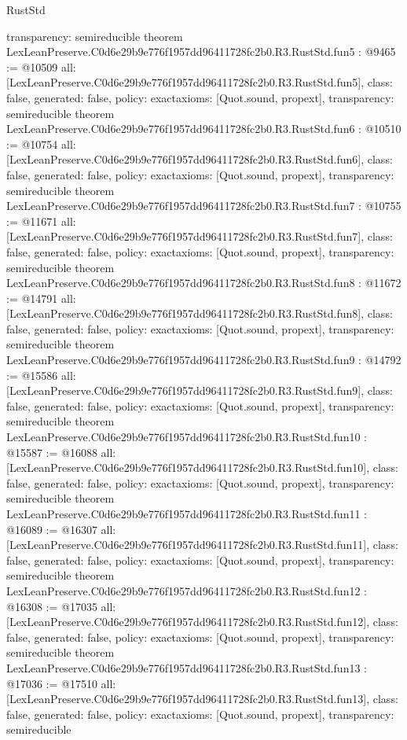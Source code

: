 \begin{lexlean}{RustStd}
\begin{coremodule}
{  transparency: semireducible
}
theorem LexLeanPreserve.C0d6e29b9e776f1957dd96411728fc2b0.R3.RustStd.fun5 : @9465 := @10509 {
  all: [LexLeanPreserve.C0d6e29b9e776f1957dd96411728fc2b0.R3.RustStd.fun5],
  class: false,
  generated: false,
  policy: exact{axioms: [Quot.sound, propext]},
  transparency: semireducible
}
theorem LexLeanPreserve.C0d6e29b9e776f1957dd96411728fc2b0.R3.RustStd.fun6 : @10510 := @10754 {
  all: [LexLeanPreserve.C0d6e29b9e776f1957dd96411728fc2b0.R3.RustStd.fun6],
  class: false,
  generated: false,
  policy: exact{axioms: [Quot.sound, propext]},
  transparency: semireducible
}
theorem LexLeanPreserve.C0d6e29b9e776f1957dd96411728fc2b0.R3.RustStd.fun7 : @10755 := @11671 {
  all: [LexLeanPreserve.C0d6e29b9e776f1957dd96411728fc2b0.R3.RustStd.fun7],
  class: false,
  generated: false,
  policy: exact{axioms: [Quot.sound, propext]},
  transparency: semireducible
}
theorem LexLeanPreserve.C0d6e29b9e776f1957dd96411728fc2b0.R3.RustStd.fun8 : @11672 := @14791 {
  all: [LexLeanPreserve.C0d6e29b9e776f1957dd96411728fc2b0.R3.RustStd.fun8],
  class: false,
  generated: false,
  policy: exact{axioms: [Quot.sound, propext]},
  transparency: semireducible
}
theorem LexLeanPreserve.C0d6e29b9e776f1957dd96411728fc2b0.R3.RustStd.fun9 : @14792 := @15586 {
  all: [LexLeanPreserve.C0d6e29b9e776f1957dd96411728fc2b0.R3.RustStd.fun9],
  class: false,
  generated: false,
  policy: exact{axioms: [Quot.sound, propext]},
  transparency: semireducible
}
theorem LexLeanPreserve.C0d6e29b9e776f1957dd96411728fc2b0.R3.RustStd.fun10 : @15587 := @16088 {
  all: [LexLeanPreserve.C0d6e29b9e776f1957dd96411728fc2b0.R3.RustStd.fun10],
  class: false,
  generated: false,
  policy: exact{axioms: [Quot.sound, propext]},
  transparency: semireducible
}
theorem LexLeanPreserve.C0d6e29b9e776f1957dd96411728fc2b0.R3.RustStd.fun11 : @16089 := @16307 {
  all: [LexLeanPreserve.C0d6e29b9e776f1957dd96411728fc2b0.R3.RustStd.fun11],
  class: false,
  generated: false,
  policy: exact{axioms: [Quot.sound, propext]},
  transparency: semireducible
}
theorem LexLeanPreserve.C0d6e29b9e776f1957dd96411728fc2b0.R3.RustStd.fun12 : @16308 := @17035 {
  all: [LexLeanPreserve.C0d6e29b9e776f1957dd96411728fc2b0.R3.RustStd.fun12],
  class: false,
  generated: false,
  policy: exact{axioms: [Quot.sound, propext]},
  transparency: semireducible
}
theorem LexLeanPreserve.C0d6e29b9e776f1957dd96411728fc2b0.R3.RustStd.fun13 : @17036 := @17510 {
  all: [LexLeanPreserve.C0d6e29b9e776f1957dd96411728fc2b0.R3.RustStd.fun13],
  class: false,
  generated: false,
  policy: exact{axioms: [Quot.sound, propext]},
  transparency: semireducible
}
\end{coremodule}
\end{lexlean}
